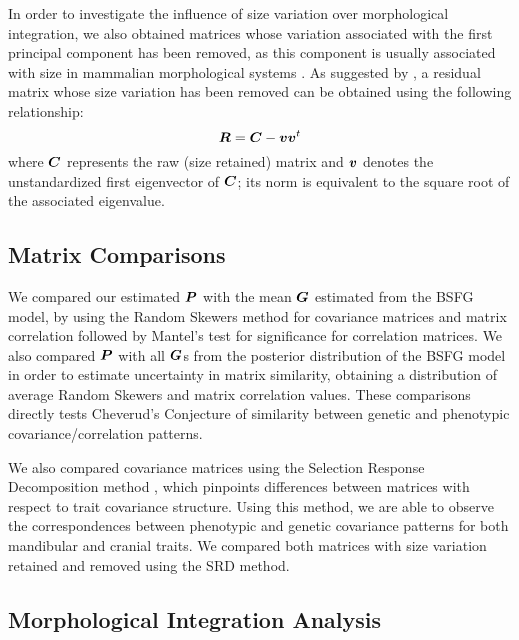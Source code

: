 \documentclass [twocolumn, natbib, nospthms, 10pt] {svjour3}
\begin{document}
In order to investigate the influence of size variation over
morphological integration, we also obtained matrices whose variation
associated with the first principal component has been removed, as
this component is usually associated with size in mammalian
morphological systems \citep{wagner_eigenvalue_1984,
  marroig_cranial_2004, porto_size_2013}. As suggested by \citet
{bookstein_morphometrics_1985}, a residual matrix whose size variation
has been removed can be obtained using the following relationship:
\begin{equation}
  \boldsymbol {R} = \boldsymbol{C} - \boldsymbol{vv}^t
  \label {eq:size}
\end{equation}
where $\boldsymbol{C}$ represents the raw (size retained) matrix and $\boldsymbol{v}$
denotes the unstandardized first eigenvector of $\boldsymbol{C}$; its norm is
equivalent to the square root of the associated eigenvalue.

\subsection {Matrix Comparisons}

We compared our estimated $\boldsymbol{P}$ with the mean $\boldsymbol{G}$ estimated
from the BSFG model, by using the Random Skewers method
\citep{cheverud_comparing_2007} for covariance matrices and matrix
correlation followed by Mantel's test for significance \citep
{cheverud_methods_1989} for correlation matrices.  We also compared
$\boldsymbol{P}$ with all $\boldsymbol{G}$s from the posterior distribution of the
BSFG model in order to estimate uncertainty in matrix similarity,
obtaining a distribution of average Random Skewers and matrix
correlation values. These comparisons directly tests Cheverud's
Conjecture \citep{cheverud_comparison_1988, roff_estimation_1995} of
similarity between genetic and phenotypic covariance/correlation
patterns.

We also compared covariance matrices using the Selection Response
Decomposition method \citep{marroig_selection_2011}, which pinpoints
differences between matrices with respect to trait covariance
structure. Using this method, we are able to observe the
correspondences between phenotypic and genetic covariance patterns for
both mandibular and cranial traits. We compared both matrices with
size variation retained and removed using the SRD method.

\subsection {Morphological Integration Analysis}
\end{document}
